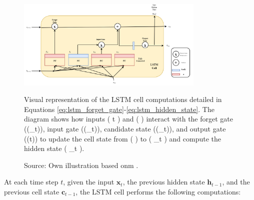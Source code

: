 \begin{figure}[htbp]
  \centering
  \includegraphics[width=0.8\textwidth]{figures/lstmcell.png}
  \caption{Visual representation of the LSTM cell computations detailed in Equations \ref{eq:lstm_forget_gate}-\ref{eq:lstm_hidden_state}. The diagram shows how inputs ( t ) and (  ) interact with the forget gate ((_t)), input gate ((_t)), candidate state ((_t)), and output gate ((t)) to update the cell state from (  ) to ( _t ) and compute the hidden state ( _t ).}
  \caption*{Source: Own illustration based onm \autocite{geron2022hands}.}
  \label{fig:lstm_cell}
\end{figure}
At each time step \( t \), given the input \( \bm{x}_t \), the previous hidden state \( \bm{h}_{t-1} \), and the previous cell state \( \bm{c}_{t-1} \), the LSTM cell performs the following computations:

